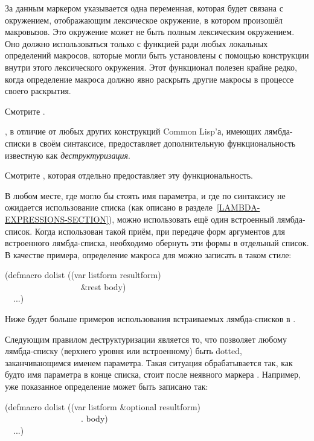 \begin{defmac}
\begin{indentdesc}{6pc}
\item[\cd{\&environment}]

За данным маркером указывается одна переменная, которая будет связана с
окружением, отображающим лексическое окружение, в котором произошёл
макровызов. Это окружение может не быть полным лексическим окружением. Оно
должно использоваться только с функцией  ради любых локальных
определений макросов, которые могли быть установлены с помощью 
конструкции внутри этого лексического окружения. Этот функционал полезен крайне
редко, когда определение макроса должно явно раскрыть другие макросы в процессе
своего раскрытия.
\end{indentdesc}

Смотрите .

, в отличие от любых других конструкций Common Lisp'а, имеющих
лямбда-списки в своём синтаксисе, предоставляет дополнительную функциональность
известную как \emph{деструктуризация}.
\begin{newer}
Смотрите , которая отдельно предоставляет эту функциональность.
\end{newer}
В любом месте, где могло бы стоять имя параметра, и где по синтаксису не
ожидается использование списка (как описано в
разделе~\ref{LAMBDA-EXPRESSIONS-SECTION}), можно использовать ещё один
встроенный лямбда-список. Когда использован такой приём, при передаче форм
аргументов для встроенного лямбда-списка, необходимо обернуть эти формы в
отдельный список.
В качестве примера, определение макроса для  можно записать в таком
стиле:
\begin{lisp}
(defmacro dolist ((var listform  resultform) \\
~~~~~~~~~~~~~~~~~~\&rest body) \\
~~...)
\end{lisp}
Ниже будет больше примеров использования встраиваемых лямбда-списков в
.

Следующим правилом деструктуризации является то, что  позволяет
любому лямбда-списку (верхнего уровня или встроенному) быть dotted,
заканчивающимся именем параметра. Такая ситуация обрабатывается так, как будто
имя параметра в конце списка, стоит после неявного маркера .
Например, уже показанное определение  может быть записано так:
\begin{lisp}
(defmacro dolist ((var listform \&optional resultform) \\
~~~~~~~~~~~~~~~~~~. body) \\
~~...)
\end{lisp}


\end{defmac}
